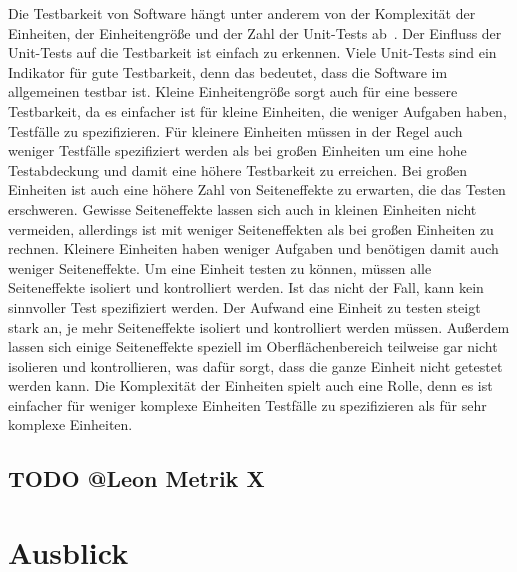 \documentclass[12pt, a4paper, ngerman]{article}
\begin{document}
Die Testbarkeit von Software hängt unter anderem von der Komplexität der Einheiten,
der Einheitengröße und der Zahl der Unit-Tests ab~\cite{maintainability_metrics}.
Der Einfluss der Unit-Tests auf die Testbarkeit ist einfach zu erkennen.
Viele Unit-Tests sind ein Indikator für gute Testbarkeit,
denn das bedeutet, dass die Software im allgemeinen testbar ist.
Kleine Einheitengröße sorgt auch für eine bessere Testbarkeit,
da es einfacher ist für kleine Einheiten, die weniger Aufgaben haben, Testfälle zu spezifizieren.
Für kleinere Einheiten müssen in der Regel auch weniger Testfälle spezifiziert werden
als bei großen Einheiten um eine hohe Testabdeckung und damit eine höhere Testbarkeit zu erreichen.
Bei großen Einheiten ist auch eine höhere Zahl von Seiteneffekte zu erwarten, die das Testen erschweren.
Gewisse Seiteneffekte lassen sich auch in kleinen Einheiten nicht vermeiden,
allerdings ist mit weniger Seiteneffekten als bei großen Einheiten zu rechnen.
Kleinere Einheiten haben weniger Aufgaben und benötigen damit auch weniger Seiteneffekte.
Um eine Einheit testen zu können, müssen alle Seiteneffekte isoliert und kontrolliert werden.
Ist das nicht der Fall, kann kein sinnvoller Test spezifiziert werden.
Der Aufwand eine Einheit zu testen steigt stark an, je mehr Seiteneffekte isoliert und kontrolliert werden müssen.
Außerdem lassen sich einige Seiteneffekte speziell im Oberflächenbereich teilweise gar nicht isolieren und kontrollieren,
was dafür sorgt, dass die ganze Einheit nicht getestet werden kann.
Die Komplexität der Einheiten spielt auch eine Rolle,
denn es ist einfacher für weniger komplexe Einheiten Testfälle zu spezifizieren als für sehr komplexe Einheiten.

\subsection{TODO @Leon Metrik X}


\section{Ausblick}


\newpage
\printbibliography
\end{document}
